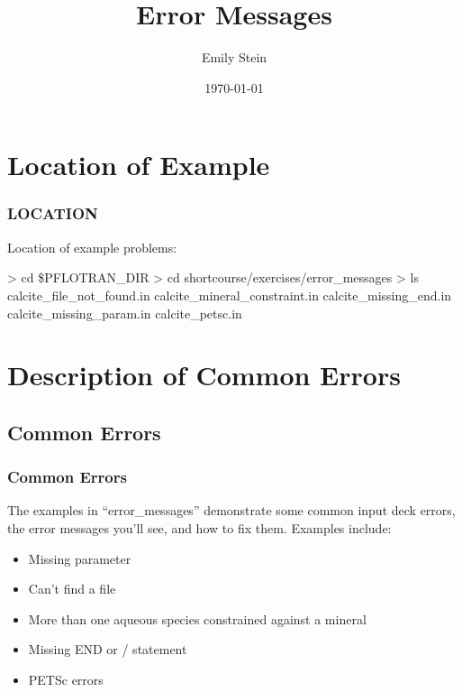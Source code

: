 \documentclass{beamer}
\newcommand\greencomment[1]{{{\color{green} #1}}}
\begin{document}
\title{Error Messages}
\author{Emily Stein}
\date{\today}


\section{Location of Example}

\begin{frame}\frametitle{LOCATION}

Location of example problems:

\begin{semiverbatim}
> cd \$PFLOTRAN_DIR
> cd shortcourse/exercises/error_messages
> ls
calcite_file_not_found.in
calcite_mineral_constraint.in
calcite_missing_end.in
calcite_missing_param.in
calcite_petsc.in
\end{semiverbatim}

\end{frame}

\section{Description of Common Errors}

\subsection{Common Errors}

\begin{frame}\frametitle{Common Errors}
The examples in ``error\_messages'' demonstrate some common input deck errors, the error messages you'll see, and how to fix them.  Examples include:
\begin{itemize}
  \item Missing parameter
  \item Can't find a file
  \item More than one aqueous species constrained against a mineral
  \item Missing \greencomment{END} or \greencomment{/} statement
  \item PETSc errors
\end{itemize}

\end{frame}

\end{document}

